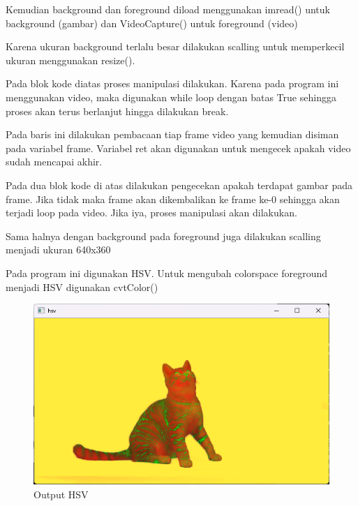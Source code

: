 \documentclass[]{article}
\begin{document}

Kemudian background dan foreground diload menggunakan imread() untuk background (gambar) dan VideoCapture() untuk foreground (video)

Karena ukuran background terlalu besar dilakukan scalling untuk memperkecil ukuran menggunakan resize().

Pada blok kode diatas proses manipulasi dilakukan. Karena pada program ini menggunakan video, maka digunakan while loop dengan batas True sehingga proses akan terus berlanjut hingga dilakukan break.

Pada baris ini dilakukan pembacaan tiap frame video yang kemudian disiman pada variabel frame. Variabel ret akan digunakan untuk mengecek apakah video sudah mencapai akhir.

Pada dua blok kode di atas dilakukan pengecekan apakah terdapat gambar pada frame. Jika tidak maka frame akan dikembalikan ke frame ke-0 sehingga akan terjadi loop pada video. Jika iya, proses manipulasi akan dilakukan.

Sama halnya dengan background pada foreground juga dilakukan scalling menjadi ukuran 640x360

Pada program ini digunakan HSV. Untuk mengubah colorspace foreground menjadi HSV digunakan cvtColor()
\begin{figure}[H]
    \centering
    \includegraphics[width=12cm]{hsv.png}
    \caption{Output HSV}
\end{figure}
\end{document}
